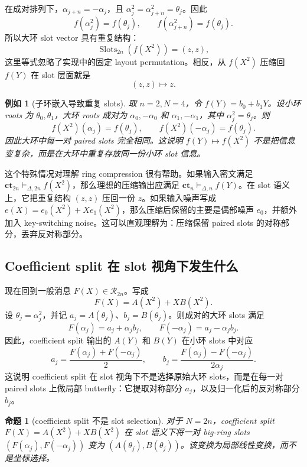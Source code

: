 \documentclass[UTF8,11pt]{article}
\newcommand{\ct}{\mathbf{ct}}
\theoremstyle{definition}
\theoremstyle{plain}
\newtheorem{proposition}{命题}
\newtheorem{example}{例如}
\begin{document}
在成对排列下，\(\alpha_{j+n}=-\alpha_j\)，且 \(\alpha_j^2=\alpha_{j+n}^2=\theta_j\)。因此
\[
f(\alpha_j^2)=f(\theta_j),\qquad
f(\alpha_{j+n}^2)=f(\theta_j).
\]
所以大环 slot vector 具有重复结构：
\[
\operatorname{Slots}_{2n}(f(X^2))=(z,z),
\]
这里等式忽略了实现中的固定 layout permutation。相反，从 \(f(X^2)\) 压缩回 \(f(Y)\) 在 slot 层面就是
\[
(z,z)\longmapsto z.
\]

\begin{example}[子环嵌入导致重复 slots]
取 \(n=2,N=4\)，令 \(f(Y)=b_0+b_1Y\)。设小环 roots 为 \(\theta_0,\theta_1\)，大环 roots 成对为 \(\alpha_0,-\alpha_0\) 和 \(\alpha_1,-\alpha_1\)，其中 \(\alpha_j^2=\theta_j\)。则
\[
f(X^2)(\alpha_j)=f(\theta_j),\qquad
f(X^2)(-\alpha_j)=f(\theta_j).
\]
因此大环中每一对 paired slots 完全相同。这说明 \(f(Y)\mapsto f(X^2)\) 不是把信息变复杂，而是在大环中重复存放同一份小环 slot 信息。
\end{example}

这个特殊情况对理解 ring compression 很有帮助。如果输入密文满足 \(\ct_{2n}\vDash_{\Delta,2n} f(X^2)\)，那么理想的压缩输出应满足 \(\ct_n\vDash_{\Delta,n} f(Y)\)。在 slot 语义上，它把重复结构 \((z,z)\) 压回一份 \(z\)。如果输入噪声写成 \(e(X)=e_0(X^2)+Xe_1(X^2)\)，那么压缩后保留的主要是偶部噪声 \(e_0\)，并额外加入 key-switching noise。这可以直观理解为：压缩保留 paired slots 的对称部分，丢弃反对称部分。

\subsection{Coefficient split 在 slot 视角下发生什么}
\label{subsec:coeff-split-slot-view}

现在回到一般消息 \(F(X)\in\mathcal R_{2n}\)。写成
\[
F(X)=A(X^2)+XB(X^2).
\]
设 \(\theta_j=\alpha_j^2\)，并记 \(a_j=A(\theta_j)\)、\(b_j=B(\theta_j)\)。则成对的大环 slots 满足
\[
F(\alpha_j)=a_j+\alpha_j b_j,\qquad
F(-\alpha_j)=a_j-\alpha_j b_j.
\]
因此，coefficient split 输出的 \(A(Y)\) 和 \(B(Y)\) 在小环 slots 中对应
\[
a_j=\frac{F(\alpha_j)+F(-\alpha_j)}{2},\qquad
b_j=\frac{F(\alpha_j)-F(-\alpha_j)}{2\alpha_j}.
\]
这说明 coefficient split 在 slot 视角下不是选择原始大环 slots，而是在每一对 paired slots 上做局部 butterfly：它提取对称部分 \(a_j\)，以及归一化后的反对称部分 \(b_j\)。

\begin{proposition}[coefficient split 不是 slot selection]
对于 \(N=2n\)，coefficient split \(F(X)=A(X^2)+XB(X^2)\) 在 slot 语义下将一对 big-ring slots \((F(\alpha_j),F(-\alpha_j))\) 变为 \((A(\theta_j),B(\theta_j))\)。该变换为局部线性变换，而不是坐标选择。
\end{proposition}
\end{document}
